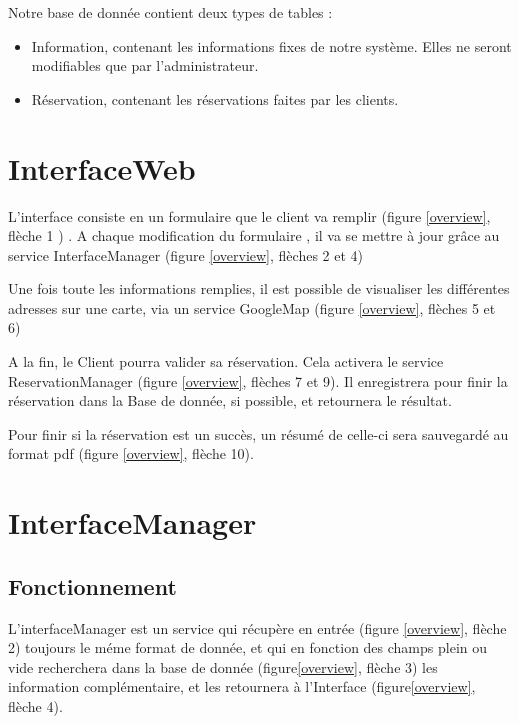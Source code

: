 		Notre base de donnée contient deux types de tables :
		
		\begin{itemize}
		  \item Information, contenant les informations fixes de notre système. Elles
		  ne seront modifiables que par l'administrateur. 
		  \item Réservation, contenant les réservations faites par les clients.
		\end{itemize}
			
	\section{InterfaceWeb}
		
		L'interface consiste en un formulaire que le client va remplir
		(figure \ref{overview}, flèche 1 ) . A chaque modification du formulaire
		, il va se mettre à jour grâce au service InterfaceManager (figure
		\ref{overview}, flèches 2 et 4)
		
		Une fois toute les informations remplies, il est possible de visualiser les
		différentes adresses sur une carte, via un service GoogleMap (figure
		\ref{overview}, flèches 5 et 6)
		
		A la fin, le Client pourra valider sa réservation. Cela activera le service
		ReservationManager (figure \ref{overview}, flèches 7 et 9). Il enregistrera
		pour finir la réservation dans la Base de donnée, si possible, et retournera
		le résultat.
		
		Pour finir si la réservation est un succès, un résumé de celle-ci sera
		sauvegardé au format pdf (figure \ref{overview}, flèche 10).
	
	\section{InterfaceManager}
	
		\subsection{Fonctionnement}
	
			L'interfaceManager est un service qui récupère en entrée (figure
			\ref{overview}, flèche 2) toujours le méme format de donnée, et qui en
			fonction des champs plein ou vide recherchera dans la base de donnée
			(figure\ref{overview}, flèche 3) les information complémentaire, et les
			retournera à l'Interface (figure\ref{overview}, flèche 4).
		
